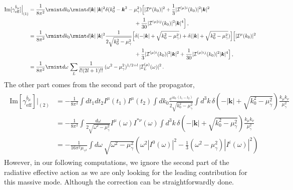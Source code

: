 \begin{align}
    \begin{split}
        \text{Im}[\gamma^{\bar{b}_{\mu}}_{\text{eff}}]\Big|_{(1)}&=\frac{1}{8\pi^2}\rmint dk_{0}\rmint d|\boldsymbol{k}|\,|\boldsymbol{k}|^2\delta(k_0^2-\boldsymbol{k}^2-\mu_{\gamma}^2)\Big[|\mathcal{I}^{\mu}(k_0)|^2+\frac{1}{3}|\mathcal{I}^{(\mu)i}(k_0)|^2|\boldsymbol{k}|^2\\ &
   \hspace{7cm}+\frac{1}{30}|\mathcal{I}^{(\mu)ij}(k_0)|^2|\boldsymbol{k}|^4\Big]
   \,,\\ &
    =\frac{1}{8\pi^2}\rmint dk_0\rmint d|\boldsymbol{k}|\,|\boldsymbol{k}|^2\frac{1}{2\sqrt{k_0^2-\mu_{\gamma}^2}}\Big[\delta(-|\boldsymbol{k}|+\sqrt{k_0^2-\mu_{\gamma}^2})+\delta(|\boldsymbol{k}|+\sqrt{k_0^2-\mu_{\gamma}^2})\Big]\Big[|\mathcal{I}^{\mu}(k_0)|^2\\ &
   \hspace{7cm}+\frac{1}{3}|\mathcal{I}^{(\mu)i}(k_0)|^2|\boldsymbol{k}|^2+\frac{1}{30}|\mathcal{I}^{(\mu)ij}(k_0)|^2|\boldsymbol{k}|^4\Big]\,,\\ &
    =\frac{1}{8\pi^2}\rmint d\omega \, \sum_{L}\frac{1}{l!(2l+1)!!}\,(\omega^2-\mu_{\gamma}^2)^{1/2+l}\,|\mathcal{I}^{(\mu)}_{L}(\omega)|^2\,.
    \label{5.50}
    \end{split}
\end{align}
The other part comes from the second part of the propagator,
\begin{align}
    \begin{split}
\text{Im}[\gamma^{\bar{b}_{\mu}}_{\text{eff}}]\Big|_{(2)}&=-\frac{1}{8\pi^2}\int dt_1 dt_2 I^{\mu}(t_1)I^{\mu}(t_2)\int dk_0\frac{e^{ik_0\,(t_1-t_2)}}{2\sqrt{k_0^2-\mu_{\gamma}^2}}\int d^3k \,\delta\left(-|\boldsymbol{k}|+\sqrt{k_0^2-\mu_{\gamma}^2}\right)\frac{k_\mu k_\nu}{\mu_{\gamma}^2}\\ &
=-\frac{1}{8\pi^2}\int \frac{d\omega}{2\sqrt{\omega^2-\mu_\gamma^2}} I^{\mu}(\omega)I^{*\nu}(\omega)\int d^3k \,\delta\left(-|\boldsymbol{k}|+\sqrt{k_0^2-\mu_{\gamma}^2}\right)\frac{k_\mu k_\nu}{\mu_{\gamma}^2}\\ &
=-\frac{1}{16\pi^2\mu_{\gamma^2}}\int d\omega \,\sqrt{\omega^2-\mu_\gamma^2}\left(\omega^2|I^{0}(\omega)|^2-\frac{1}{3}(\omega^2-\mu_\gamma^2)|I^{i}(\omega)|^2\right)
\end{split}
\end{align}
However, in our following computations, we ignore the second part of the radiative effective action as we are only looking for the leading contribution for this massive mode. Although the correction can be straightforwardly done.
